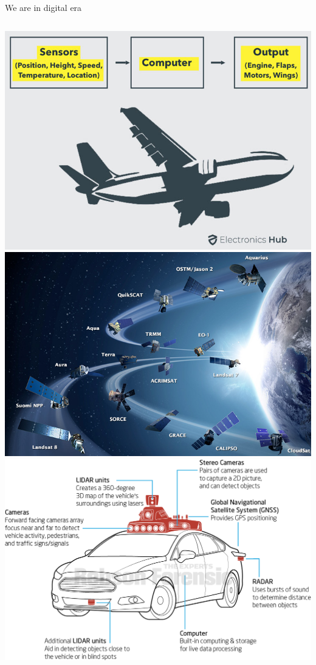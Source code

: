 \documentclass[aspectratio=169,xcolor=dvipsnames,svgnames,x11names,fleqn]{beamer}
\begin{document}
\begin{frame}{We are in digital era}
\centering
    \begin{columns}
          \includegraphics[width=0.99\linewidth]{figures/Types-of-Sensors-in-Auto-Pilot.jpg}
          \includegraphics[width=0.99\linewidth]{figures/EarthSat_HD.jpg}
          \includegraphics[width=0.99\linewidth]{figures/avsensors.png}
    \end{columns}
\end{frame}
\end{document}
